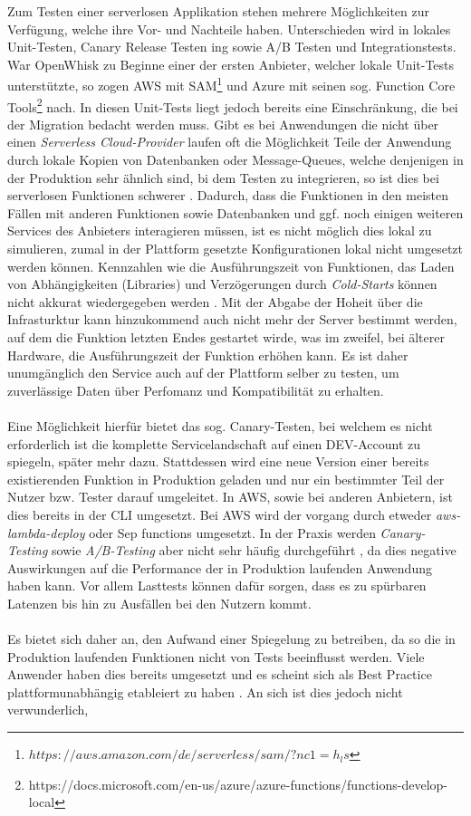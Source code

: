 \documentclass[11pt]{article}
\begin{document}
Zum Testen einer serverlosen Applikation stehen mehrere Möglichkeiten zur Verfügung, welche ihre Vor- und Nachteile haben. Unterschieden wird in lokales Unit-Testen, Canary Release Testen ing sowie A/B Testen und Integrationstests. War OpenWhisk zu Beginne einer der ersten Anbieter, welcher lokale Unit-Tests unterstützte, so zogen AWS mit SAM\footnote{$https://aws.amazon.com/de/serverless/sam/?nc1=h_ls$} und Azure mit seinen sog. Function Core Tools\footnote{https://docs.microsoft.com/en-us/azure/azure-functions/functions-develop-local} nach. In diesen Unit-Tests liegt jedoch bereits eine Einschränkung, die bei der Migration bedacht werden muss. Gibt es bei Anwendungen die nicht über einen \textit{Serverless Cloud-Provider} laufen oft die Möglichkeit Teile der Anwendung durch lokale Kopien von Datenbanken oder Message-Queues, welche denjenigen in der Produktion sehr ähnlich sind, bi dem Testen zu integrieren, so ist dies bei serverlosen Funktionen schwerer \cite{roberts2017serverless}.  Dadurch, dass die Funktionen in den meisten Fällen mit anderen Funktionen sowie Datenbanken und ggf. noch einigen weiteren Services des Anbieters interagieren müssen, ist es nicht möglich dies lokal zu simulieren, zumal in der Plattform gesetzte Konfigurationen lokal nicht umgesetzt werden können. Kennzahlen wie die Ausführungszeit von Funktionen, das Laden von Abhängigkeiten (Libraries) und Verzögerungen durch \textit{Cold-Starts} können nicht akkurat wiedergegeben werden \cite{racicot2019quality}. Mit der Abgabe der Hoheit über die Infrasturktur kann hinzukommend auch nicht mehr der Server bestimmt werden, auf dem die Funktion letzten Endes gestartet wirde, was im zweifel, bei älterer Hardware, die Ausführungszeit der Funktion erhöhen kann. Es ist daher unumgänglich den Service auch auf der Plattform selber zu testen, um zuverlässige Daten über Perfomanz und Kompatibilität zu erhalten.\\\\ Eine Möglichkeit hierfür bietet das sog. Canary-Testen, bei welchem es nicht erforderlich ist die komplette Servicelandschaft auf einen DEV-Account zu spiegeln, später mehr dazu. Stattdessen wird eine neue Version einer bereits existierenden Funktion in Produktion geladen und nur ein bestimmter Teil der Nutzer bzw. Tester darauf umgeleitet. In AWS, sowie bei anderen Anbietern, ist dies bereits in der CLI umgesetzt. Bei AWS wird der vorgang durch etweder \textit{aws-lambda-deploy} oder Sep functions umgesetzt. In der Praxis werden \textit{Canary-Testing} sowie \textit{A/B-Testing} aber nicht sehr häufig durchgeführt \cite{leitner2019mixed}, da dies negative Auswirkungen auf die Performance der in Produktion laufenden Anwendung haben kann. Vor allem Lasttests können dafür sorgen, dass es zu spürbaren Latenzen bis hin zu Ausfällen bei den Nutzern kommt.\\\\ Es bietet sich daher an, den Aufwand einer Spiegelung zu betreiben, da so die in Produktion laufenden Funktionen nicht von Tests beeinflusst werden. Viele Anwender haben dies bereits umgesetzt und es scheint sich als \glqq Best Practice\grqq{} plattformunabhängig etableiert zu haben \cite{leitner2019mixed}. An sich ist dies jedoch nicht verwunderlich, 
\end{document}
